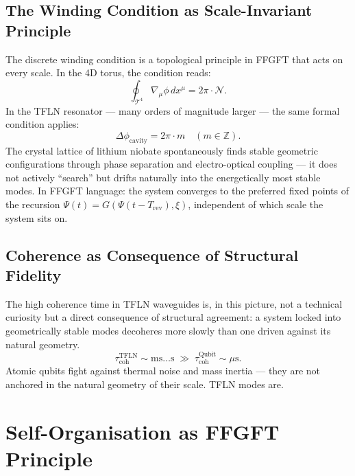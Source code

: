 \subsection{The Winding Condition as Scale-Invariant Principle}

The discrete winding condition is a topological principle in FFGFT
that acts on every scale. In the 4D torus, the condition reads:
\begin{equation}
  \oint_{\mathcal{T}^4} \nabla_{\mu}\phi\,dx^\mu = 2\pi\cdot\mathcal{N}.
\end{equation}
In the TFLN resonator — many orders of magnitude larger — the same
formal condition applies:
\begin{equation}
  \Delta\phi_{\text{cavity}} = 2\pi\cdot m \quad (m \in \mathbb{Z}).
\end{equation}
The crystal lattice of lithium niobate spontaneously finds stable
geometric configurations through phase separation and electro-optical
coupling — it does not actively ``search'' but drifts naturally into
the energetically most stable modes. In FFGFT language: the system
converges to the preferred fixed points of the recursion
$\Psi(t) = G(\Psi(t-T_{\text{rev}}), \xi)$,
independent of which scale the system sits on.

\subsection{Coherence as Consequence of Structural Fidelity}

The high coherence time in TFLN waveguides is, in this picture, not
a technical curiosity but a direct consequence of structural agreement:
a system locked into geometrically stable modes decoheres more slowly
than one driven against its natural geometry.
\begin{equation}
  \tau_{\text{coh}}^{\text{TFLN}} \sim \text{ms}\ldots\text{s}
  \;\gg\;
  \tau_{\text{coh}}^{\text{Qubit}} \sim \mu\text{s}.
\end{equation}
Atomic qubits fight against thermal noise and mass inertia — they are
not anchored in the natural geometry of their scale. TFLN modes are.

\section{Self-Organisation as FFGFT Principle}

